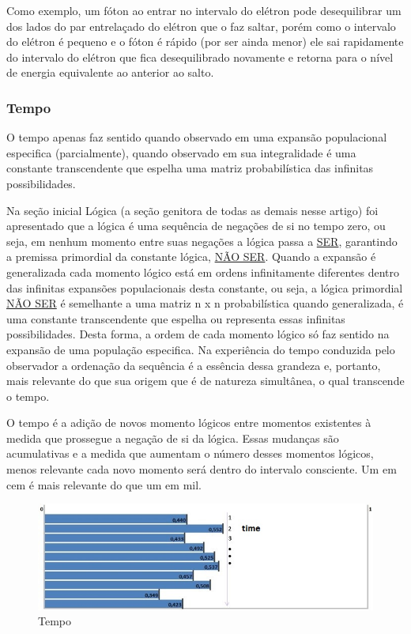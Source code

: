 Como exemplo, um fóton ao entrar no intervalo do elétron pode desequilibrar um dos lados do par entrelaçado do elétron que o faz saltar, porém como o intervalo do elétron é pequeno e o fóton é rápido (por ser ainda menor) ele sai rapidamente do intervalo do elétron que fica desequilibrado novamente e retorna para o nível de energia equivalente ao anterior ao salto.

\subsubsection{Tempo}
O tempo apenas faz sentido quando observado em uma expansão populacional especifica (parcialmente), quando observado em sua integralidade é uma constante transcendente que espelha uma matriz probabilística das infinitas possibilidades. 

Na seção inicial Lógica (a seção genitora de todas as demais nesse artigo) foi apresentado que a lógica é uma sequência de negações de si no tempo zero, ou seja, em nenhum momento entre suas negações a lógica passa a \underline{SER}, garantindo a premissa primordial da constante lógica, \underline{NÃO SER}. Quando a expansão é generalizada cada momento lógico está em ordens infinitamente diferentes dentro das infinitas expansões populacionais desta constante, ou seja, a lógica primordial \underline{NÃO SER} é semelhante a uma matriz n x n probabilística quando generalizada, é uma constante transcendente que espelha ou representa essas infinitas possibilidades. Desta forma, a ordem de cada momento lógico só faz sentido na expansão de uma população especifica. Na experiência do tempo conduzida pelo observador a ordenação da sequência é a essência dessa grandeza e, portanto, mais relevante do que sua origem que é de natureza simultânea, o qual transcende o tempo.

O tempo é a adição de novos momento lógicos entre momentos existentes à medida que prossegue a negação de si da lógica. Essas mudanças são acumulativas e a medida que aumentam o número desses momentos lógicos, menos relevante cada novo momento será dentro do intervalo consciente. Um em cem é mais relevante do que um em mil. 
	\begin{figure}[H]
	\caption{Tempo}
	\label{fig:consciousness_time}
	\centering
	\includegraphics[scale=.8]{sections/images/consciousness_time.jpg}
	\end{figure}

